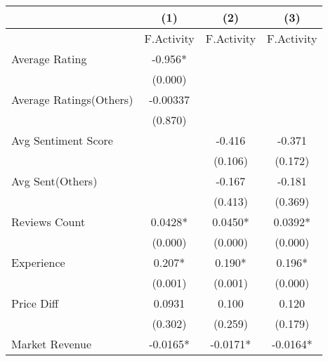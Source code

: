 \begin{table}[]
\centering
\begin{tabular}{@{}lccc@{}}
\toprule
                                                         & (1)        & (2)        & (3)        \\ \midrule
                                                         & F.Activity & F.Activity & F.Activity \\
Average Rating                                           & -0.956*    &            &            \\
                                                         & (0.000)    &            &            \\
Average Ratings(Others)                                  & -0.00337   &            &            \\
                                                         & (0.870)    &            &            \\
Avg Sentiment Score                                      &            & -0.416     & -0.371     \\
                                                         &            & (0.106)    & (0.172)    \\
Avg Sent(Others)                                         &            & -0.167     & -0.181     \\
                                                         &            & (0.413)    & (0.369)    \\
Reviews Count                                            & 0.0428*    & 0.0450*    & 0.0392*    \\
                                                         & (0.000)    & (0.000)    & (0.000)    \\
Experience                                               & 0.207*     & 0.190*     & 0.196*     \\
                                                         & (0.001)    & (0.001)    & (0.000)    \\
Price Diff                                               & 0.0931     & 0.100      & 0.120      \\
                                                         & (0.302)    & (0.259)    & (0.179)    \\
Market Revenue                                           & -0.0165*   & -0.0171*   & -0.0164*   \\

\end{tabular}
\end{table}
